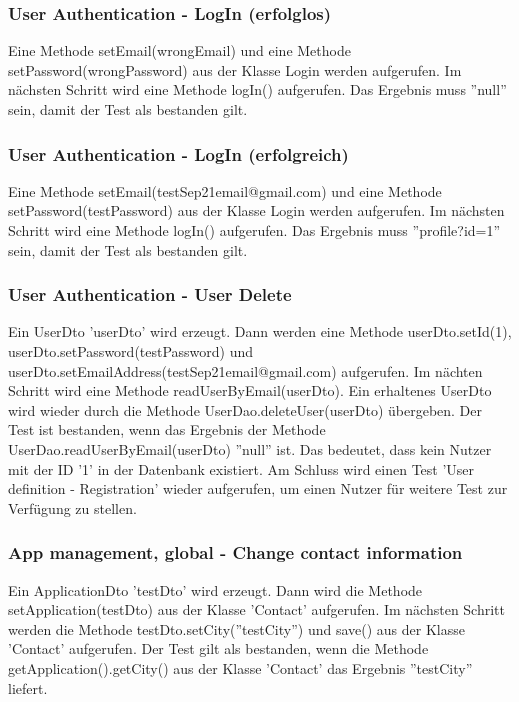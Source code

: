 \documentclass{article}
\begin{document}
\subsubsection{User Authentication - LogIn (erfolglos)}
Eine Methode setEmail(wrongEmail) und eine Methode setPassword(wrongPassword) aus der Klasse Login werden aufgerufen. Im nächsten Schritt wird eine Methode logIn() aufgerufen. Das Ergebnis muss ''null'' sein, damit der Test als bestanden gilt. 

\subsubsection{User Authentication - LogIn (erfolgreich)}
Eine Methode setEmail(testSep21email@gmail.com) und eine Methode setPassword(testPassword) aus der Klasse Login werden aufgerufen. Im nächsten Schritt wird eine Methode logIn() aufgerufen. Das Ergebnis muss ''profile?id=1'' sein, damit der Test als bestanden gilt.

\subsubsection{User Authentication - User Delete}
Ein UserDto 'userDto' wird erzeugt. Dann werden eine Methode userDto.setId(1), \linebreak userDto.setPassword(testPassword) und userDto.setEmailAddress(testSep21email@gmail.com) aufgerufen. Im nächten Schritt wird eine Methode readUserByEmail(userDto).
Ein erhaltenes UserDto wird wieder durch die Methode UserDao.deleteUser(userDto) übergeben. Der Test ist bestanden, wenn das Ergebnis der Methode UserDao.readUserByEmail(userDto) ''null'' ist. Das bedeutet, dass kein Nutzer mit der ID '1' in der Datenbank existiert. Am Schluss wird einen Test 'User definition - Registration' wieder aufgerufen, um einen Nutzer für weitere Test zur Verfügung zu stellen.

\subsubsection{App management, global - Change contact information}
Ein ApplicationDto 'testDto' wird erzeugt. Dann wird die Methode setApplication(testDto) aus der Klasse 'Contact' aufgerufen. Im nächsten Schritt werden die Methode testDto.setCity(''testCity'') und save() aus der Klasse 'Contact' aufgerufen. Der Test gilt als bestanden, wenn die Methode getApplication().getCity() aus der Klasse 'Contact' das Ergebnis ''testCity'' liefert.
\end{document}
